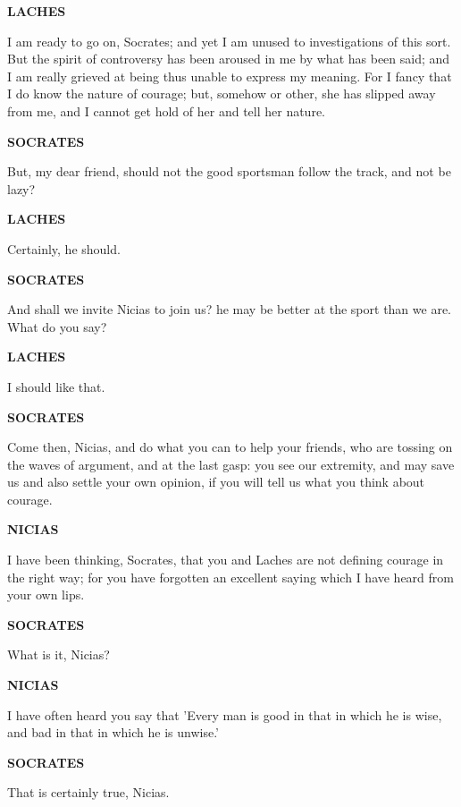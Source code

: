 \documentclass[11pt,letter]{book}
\begin{document}
\par \textbf{LACHES}
\par   I am ready to go on, Socrates; and yet I am unused to investigations of this sort. But the spirit of controversy has been aroused in me by what has been said; and I am really grieved at being thus unable to express my meaning. For I fancy that I do know the nature of courage; but, somehow or other, she has slipped away from me, and I cannot get hold of her and tell her nature.

\par \textbf{SOCRATES}
\par   But, my dear friend, should not the good sportsman follow the track, and not be lazy?

\par \textbf{LACHES}
\par   Certainly, he should.

\par \textbf{SOCRATES}
\par   And shall we invite Nicias to join us? he may be better at the sport than we are. What do you say?

\par \textbf{LACHES}
\par   I should like that.

\par \textbf{SOCRATES}
\par   Come then, Nicias, and do what you can to help your friends, who are tossing on the waves of argument, and at the last gasp:  you see our extremity, and may save us and also settle your own opinion, if you will tell us what you think about courage.

\par \textbf{NICIAS}
\par   I have been thinking, Socrates, that you and Laches are not defining courage in the right way; for you have forgotten an excellent saying which I have heard from your own lips.

\par \textbf{SOCRATES}
\par   What is it, Nicias?

\par \textbf{NICIAS}
\par   I have often heard you say that 'Every man is good in that in which he is wise, and bad in that in which he is unwise.'

\par \textbf{SOCRATES}
\par   That is certainly true, Nicias.
\end{document}
